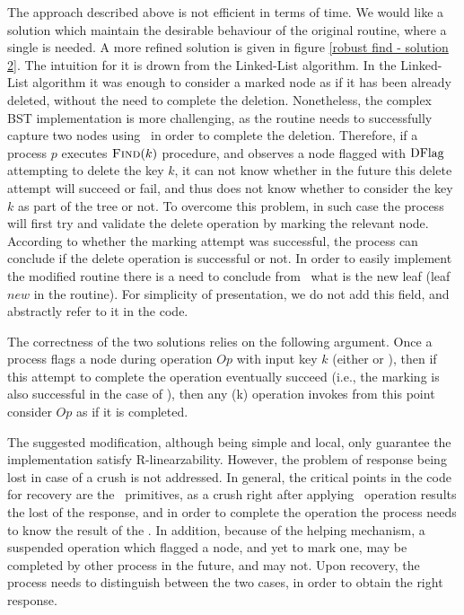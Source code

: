 The approach described above is not efficient in terms of time. We would like a solution which maintain the desirable behaviour of the original  routine, where a single  is needed. A more refined solution is given in figure \ref{robust find - solution 2}. The intuition for it is drown from the Linked-List algorithm.
In the Linked-List algorithm it was enough to consider a marked node as if it has been already deleted, without the need to complete the deletion. Nonetheless, the complex BST implementation is more challenging, as the  routine needs to successfully capture two nodes using \CASB\ in order to complete the deletion. Therefore, if a process $p$ executes $\mbox{\sc Find}(k)$ procedure, and observes a node flagged with $\mbox{DFlag}$ attempting to delete the key $k$, it can not know whether in the future this delete attempt will succeed or fail, and thus does not know whether to consider the key $k$ as part of the tree or not. To overcome this problem, in such case the process will first try and validate the delete operation by marking the relevant node. According to whether the marking attempt was successful, the process can conclude if the delete operation is successful or not.
In order to easily implement the modified  routine there is a need to conclude from \IFlag\ what is the new leaf (leaf $new$ in the  routine). For simplicity of presentation, we do not add this field, and abstractly refer to it in the code.

The correctness of the two solutions relies on the following argument.
Once a process flags a node during operation $Op$ with input key $k$ (either  or ), then if this attempt to complete the operation eventually succeed (i.e., the marking is also successful in the case of ), then any (k) operation invokes from this point consider $Op$ as if it is completed.

The suggested modification, although being simple and local, only guarantee the implementation satisfy R-linearzability. However, the problem of response being lost in case of a crush is not addressed. In general, the critical points in the code for recovery are the \CASB\ primitives, as a crush right after applying \CASB\ operation results the lost of the response, and in order to complete the operation the process needs to know the result of the \CASB. In addition, because of the helping mechanism, a suspended  operation which flagged a node, and yet to mark one, may be completed by other process in the future, and may not. Upon recovery, the process needs to distinguish between the two cases, in order to obtain the right response.

